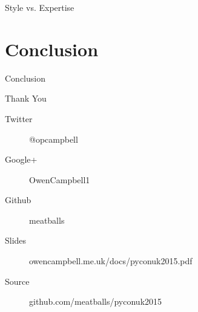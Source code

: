 \documentclass[14pt]{beamer}
\begin{document}
    \begin{frame}{Style vs. Expertise}
      
    \end{frame}

  \section{Conclusion}

    \begin{frame}{Conclusion}
    \end{frame}

    \begin{frame}{Thank You}
      \begin{description}
        \item [Twitter] @opcampbell
        \item [Google+] OwenCampbell1
        \item [Github] meatballs
      \end{description}
      \vfill
      \begin{description}
        \item [Slides] {\small owencampbell.me.uk/docs/pyconuk2015.pdf}
        \item [Source] {\small github.com/meatballs/pyconuk2015}
      \end{description}
    \end{frame}
\end{document}
